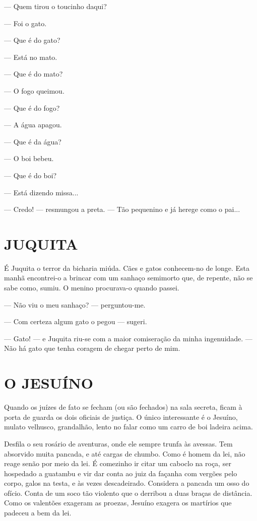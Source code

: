 --- Quem tirou o toucinho daqui?

--- Foi o gato.

--- Que é do gato?

--- Está no mato.

--- Que é do mato?

--- O fogo queimou.

--- Que é do fogo?

--- A água apagou.

--- Que é da água?

--- O boi bebeu.

--- Que é do boi?

--- Está dizendo missa...

--- Credo! --- resmungou a preta. --- Tão pequenino e já herege como o
pai...

\section{JUQUITA}

É Juquita o terror da bicharia miúda. Cães e gatos conhecem-no de longe.
Esta manhã encontrei-o a brincar com um sanhaço semimorto que, de
repente, não se sabe como, sumiu. O menino procurava-o quando passei.

--- Não viu o meu sanhaço? --- perguntou-me.

--- Com certeza algum gato o pegou --- sugeri.

--- Gato! --- e Juquita riu-se com a maior comiseração da minha
ingenuidade. --- Não há gato que tenha coragem de chegar perto de mim.

\section{O JESUÍNO}

Quando os juízes de fato se fecham (ou são fechados) na sala secreta,
ficam à porta de guarda os dois oficiais de justiça. O único
interessante é o Jesuíno, mulato velhusco, grandalhão, lento no falar
como um carro de boi ladeira acima.

Desfila o seu rosário de aventuras, onde ele sempre trunfa às avessas.
Tem absorvido muita pancada, e até cargas de chumbo. Como é homem da
lei, não reage senão por meio da lei. É comezinho ir citar um caboclo na
roça, ser hospedado a guatambu e vir dar conta ao juiz da façanha com
vergões pelo corpo, galos na testa, e às vezes descadeirado. Considera a
pancada um osso do ofício. Conta de um soco tão violento que o derribou
a duas braças de distância. Como os valentões exageram as proezas,
Jesuíno exagera os martírios que padeceu a bem da lei.

